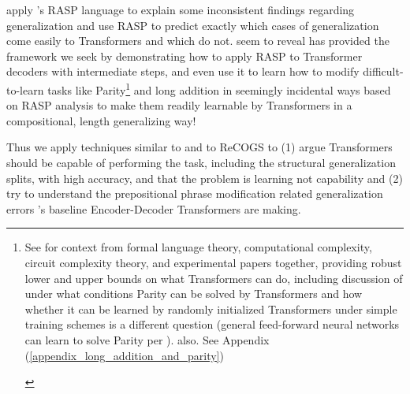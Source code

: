 \documentclass[11pt]{article}
\begin{document}
\cite{Zhou2024} apply \cite{Weiss2021}'s RASP language to explain some inconsistent findings regarding generalization and use RASP to predict exactly which cases of generalization come easily to Transformers and which do not. \cite{Zhou2024} seem to reveal \cite{Weiss2021} has provided the framework we seek by demonstrating how to apply RASP to Transformer decoders with intermediate steps, and even use it to learn how to modify difficult-to-learn tasks like Parity\footnote{\begin{footnotesize}See \cite{Strobl2024} for context from formal language theory, computational complexity, circuit complexity theory, and experimental papers together, providing robust lower and upper bounds on what Transformers can do, including discussion of under what conditions Parity can be solved by Transformers and how whether it can be learned by randomly initialized Transformers under simple training schemes is a different question (general feed-forward neural networks can learn to solve Parity per \cite{10.7551/mitpress/4943.003.0128}). \cite{delétang2023neuralnetworkschomskyhierarchy} also. See Appendix (\ref{appendix_long_addition_and_parity})\end{footnotesize}} and long addition in seemingly incidental ways based on RASP analysis to make them readily learnable by Transformers in a compositional, length generalizing way!

Thus we apply techniques similar to \cite{Zhou2024} and \cite{Weiss2021} to ReCOGS to (1) argue Transformers should be capable of performing the task, including the structural generalization splits, with high accuracy, and that the problem is learning not capability and (2) try to understand the prepositional phrase modification related generalization errors \cite{Wu2023}'s baseline Encoder-Decoder Transformers are making.
\end{document}
